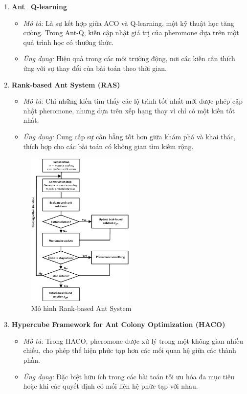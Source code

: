 \documentclass[14pt]{article}
\begin{document}
\begin{enumerate}
		\item \textbf{Ant\_Q-learning}
		\begin{itemize}
			\item \textit{Mô tả:} Là sự kết hợp giữa ACO và Q-learning, một kỹ thuật học tăng cường. Trong Ant-Q, kiến cập nhật giá trị của pheromone dựa trên một quá trình học có thưởng thức.
			\item \textit{Ứng dụng:} Hiệu quả trong các môi trường động, nơi các kiến cần thích ứng với sự thay đổi của bài toán theo thời gian.
		\end{itemize}
		\newpage
		\item \textbf{Rank-based Ant System (RAS)}
		\begin{itemize}
			\item \textit{Mô tả:} Chỉ những kiến tìm thấy các lộ trình tốt nhất mới được phép cập nhật pheromone, nhưng dựa trên xếp hạng thay vì chỉ có một kiến tốt nhất.
			\item \textit{Ứng dụng:} Cung cấp sự cân bằng tốt hơn giữa khám phá và khai thác, thích hợp cho các bài toán có không gian tìm kiếm rộng.
		\end{itemize}
		\begin{figure}[htbp]
			\centering
			\includegraphics[width=0.5\textwidth]{./Image/Mô hình Rank-based Ant System.png}
			\caption{Mô hình Rank-based Ant System}
			\label{fig:mylabel}
		\end{figure}
	
		\item \textbf{Hypercube Framework for Ant Colony Optimization (HACO)}
		\begin{itemize}
			\item \textit{Mô tả:} Trong HACO, pheromone được xử lý trong một không gian nhiều chiều, cho phép thể hiện phức tạp hơn các mối quan hệ giữa các thành phần.
			\item \textit{Ứng dụng:} Đặc biệt hữu ích trong các bài toán tối ưu hóa đa mục tiêu hoặc khi các quyết định có mối liên hệ phức tạp với nhau.
		\end{itemize}
	\end{enumerate}
	\newpage
\end{document}
